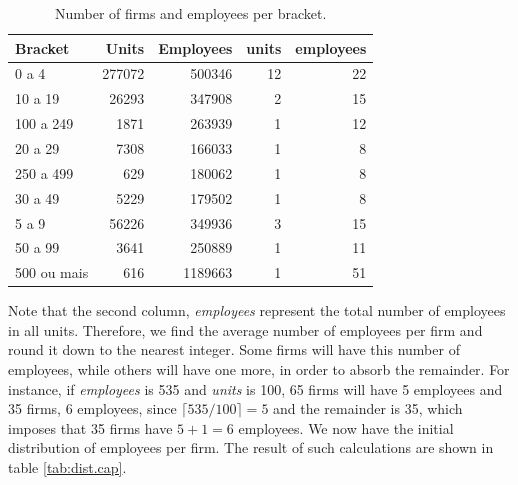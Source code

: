 \documentclass[11pt,]{article}
\begin{document}
\begin{table}

\caption{\label{tab:unnamed-chunk-14}\label{tab:dist.percs} Number of firms and employees per bracket.}
\centering
\begin{tabular}[t]{lrrrr}
\toprule
Bracket & Units & Employees & units & employees\\
\midrule
0 a 4 & 277072 & 500346 & 12 & 22\\
10 a 19 & 26293 & 347908 & 2 & 15\\
100 a 249 & 1871 & 263939 & 1 & 12\\
20 a 29 & 7308 & 166033 & 1 & 8\\
250 a 499 & 629 & 180062 & 1 & 8\\
30 a 49 & 5229 & 179502 & 1 & 8\\
5 a 9 & 56226 & 349936 & 3 & 15\\
50 a 99 & 3641 & 250889 & 1 & 11\\
500 ou mais & 616 & 1189663 & 1 & 51\\
\bottomrule
\end{tabular}
\end{table}

Note that the second column, \emph{employees} represent the total number
of employees in all units. Therefore, we find the average number of
employees per firm and round it down to the nearest integer. Some firms
will have this number of employees, while others will have one more, in
order to absorb the remainder. For instance, if \emph{employees} is 535
and \emph{units} is 100, 65 firms will have 5 employees and 35 firms, 6
employees, since \(\lceil 535/100 \rceil = 5\) and the remainder is 35,
which imposes that 35 firms have \(5 + 1 = 6\) employees. We now have
the initial distribution of employees per firm. The result of such
calculations are shown in table \ref{tab:dist.cap}.
\end{document}
